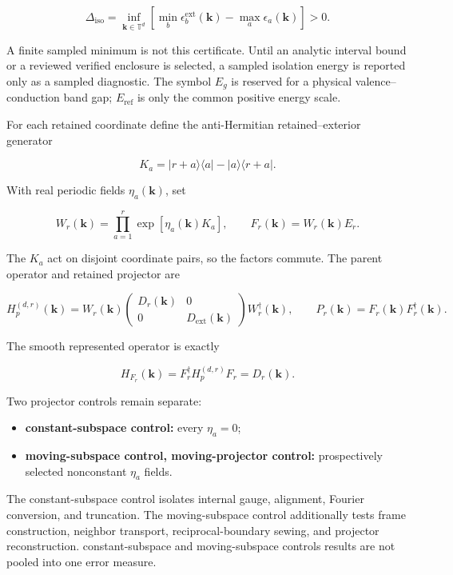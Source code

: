 \documentclass[11pt]{article}
\begin{document}
\[
\Delta_{\mathrm{iso}}=\inf_{\mathbf k\in\mathbb T^d}
\left[
\min_b\epsilon_b^{\mathrm{ext}}(\mathbf k)
-\max_a\epsilon_a(\mathbf k)
\right]>0.
\]

A finite sampled minimum is not this certificate. Until an analytic interval bound or a
reviewed verified enclosure is selected, a sampled isolation energy is reported only as
a sampled diagnostic. The symbol $E_g$ is reserved for a physical valence--conduction
band gap; $E_{\mathrm{ref}}$ is only the common positive energy scale.

For each retained coordinate define the anti-Hermitian retained--exterior generator

\[
K_a=|r+a\rangle\langle a|-|a\rangle\langle r+a|.
\]

With real periodic fields $\eta_a(\mathbf k)$, set

\[
W_r(\mathbf k)=\prod_{a=1}^{r}
\exp\!\left[\eta_a(\mathbf k)K_a\right],
\qquad
F_r(\mathbf k)=W_r(\mathbf k)E_r.
\]

The $K_a$ act on disjoint coordinate pairs, so the factors commute. The parent operator
and retained projector are

\[
H_p^{(d,r)}(\mathbf k)=W_r(\mathbf k)
\begin{pmatrix}
D_r(\mathbf k)&0\\
0&D_{\mathrm{ext}}(\mathbf k)
\end{pmatrix}
W_r^\dagger(\mathbf k),
\qquad
P_r(\mathbf k)=F_r(\mathbf k)F_r^\dagger(\mathbf k).
\]

The smooth represented operator is exactly

\[
H_{F_r}(\mathbf k)=F_r^\dagger H_p^{(d,r)}F_r=D_r(\mathbf k).
\]

Two projector controls remain separate:

\begin{itemize}
\item \textbf{constant-subspace control:} every $\eta_a=0$;
\item \textbf{moving-subspace control, moving-projector control:} prospectively selected nonconstant $\eta_a$ fields.
\end{itemize}

The constant-subspace control isolates internal gauge, alignment, Fourier conversion, and truncation. The moving-subspace control additionally
tests frame construction, neighbor transport, reciprocal-boundary sewing, and projector
reconstruction. constant-subspace and moving-subspace controls results are not pooled into one error measure.
\end{document}

